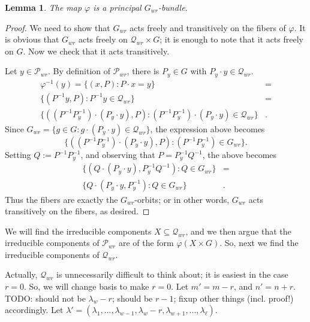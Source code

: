 \documentclass[12pt,psamsfonts]{article}
\newtheorem{lemma}[theorem]{Lemma}
\begin{document}
\begin{lemma}\label{principal_bundle}
    The map \(\varphi\) is a principal \(G_{wr}\)-bundle.
\end{lemma}
\begin{proof}
    We need to show that \(G_{wr}\) acts freely and transitively on the fibers of \(\varphi\).
    It is obvious that \(G_{wr}\) acts freely on \(\mathcal{Q}_{wr} \times G\); it is enough to note that it acts freely on \(G\).
    Now we check that it acts transitively.
    \par Let \(y \in \mathcal{P}_{wr}\).
    By definition of \(\mathcal{P}_{wr}\), there is \(P_y \in G\) with \(P_y \cdot y \in \mathcal{Q}_{wr}\).
    \begin{align*}
        \varphi^{-1}(y) = \{(x, P) : P \cdot x = y \} & = \\
        \{(P^{-1} y, P) : P^{-1} y \in \mathcal{Q}_{wr} \} & = \\
        \{((P^{-1}P_y^{-1}) \cdot (P_y \cdot y), P) : (P^{-1} P_y^{-1}) \cdot (P_y \cdot y) \in \mathcal{Q}_{wr}\} & .
    \end{align*}
    Since \(G_{wr} = \{g \in G : g \cdot (P_y \cdot y) \in \mathcal{Q}_{wr}\}\), the expression above becomes
    \[\{((P^{-1}P_y^{-1}) \cdot (P_y \cdot y), P) : (P^{-1} P_y^{-1}) \in G_{wr}\}.\]
    Setting \(Q := P^{-1} P_y^{-1}\), and observing that \(P = P_y^{-1} Q^{-1}\), the above becomes
    \begin{align*}
        \{(Q \cdot (P_y \cdot y), P_y^{-1} Q^{-1}) : Q \in G_{wr}\} & = \\
        \{Q \cdot (P_y \cdot y, P_y^{-1}) : Q \in G_{wr}\} & .
    \end{align*}
    Thus the fibers are exactly the \(G_{wr}\)-orbits; or in other words, \(G_{wr}\) acts transitively on the fibers, as desired.
\end{proof}
We will find the irreducible components \(X \subseteq \mathcal{Q}_{wr}\), and we then argue that the irreducible components of \(\mathcal{P}_{wr}\) are of the form \(\varphi(X \times G)\).
So, next we find the irreducible components of \(\mathcal{Q}_{wr}\).
\par Actually, \(\mathcal{Q}_{wr}\) is unnecessarily difficult to think about; it is easiest in the case \(r = 0\).
So, we will change basis to make \(r = 0\).
Let \(m' = m - r\), and \(n' = n + r\).
TODO: should not be \(\lambda_w - r\); should be \(r - 1\); fixup other things (incl. proof!) accordingly.
Let \(\lambda' = (\lambda_1, ..., \lambda_{w - 1}, \lambda_w - r, \lambda_{w + 1}, ..., \lambda_\ell)\).
\end{document}
